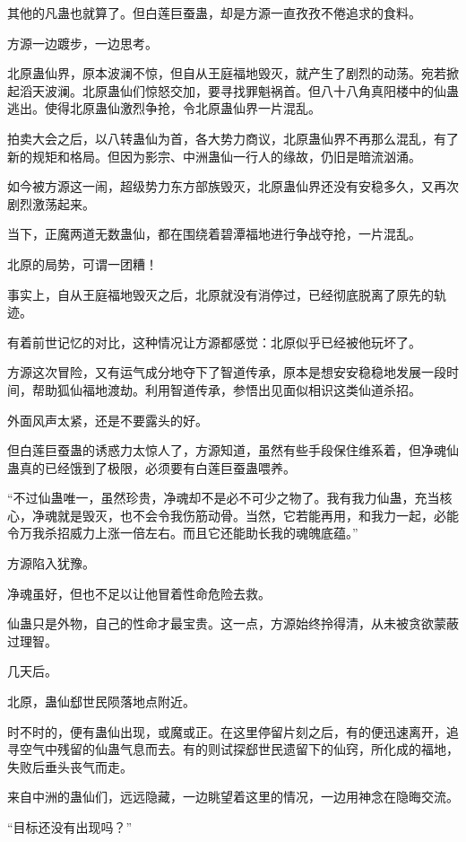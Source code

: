 \begin{this_body}
其他的凡蛊也就算了。但白莲巨蚕蛊，却是方源一直孜孜不倦追求的食料。

方源一边踱步，一边思考。

北原蛊仙界，原本波澜不惊，但自从王庭福地毁灭，就产生了剧烈的动荡。宛若掀起滔天波澜。北原蛊仙们惊怒交加，要寻找罪魁祸首。但八十八角真阳楼中的仙蛊逃出。使得北原蛊仙激烈争抢，令北原蛊仙界一片混乱。

拍卖大会之后，以八转蛊仙为首，各大势力商议，北原蛊仙界不再那么混乱，有了新的规矩和格局。但因为影宗、中洲蛊仙一行人的缘故，仍旧是暗流汹涌。

如今被方源这一闹，超级势力东方部族毁灭，北原蛊仙界还没有安稳多久，又再次剧烈激荡起来。

当下，正魔两道无数蛊仙，都在围绕着碧潭福地进行争战夺抢，一片混乱。

北原的局势，可谓一团糟！

事实上，自从王庭福地毁灭之后，北原就没有消停过，已经彻底脱离了原先的轨迹。

有着前世记忆的对比，这种情况让方源都感觉：北原似乎已经被他玩坏了。

方源这次冒险，又有运气成分地夺下了智道传承，原本是想安安稳稳地发展一段时间，帮助狐仙福地渡劫。利用智道传承，参悟出见面似相识这类仙道杀招。

外面风声太紧，还是不要露头的好。

但白莲巨蚕蛊的诱惑力太惊人了，方源知道，虽然有些手段保住维系着，但净魂仙蛊真的已经饿到了极限，必须要有白莲巨蚕蛊喂养。

“不过仙蛊唯一，虽然珍贵，净魂却不是必不可少之物了。我有我力仙蛊，充当核心，净魂就是毁灭，也不会令我伤筋动骨。当然，它若能再用，和我力一起，必能令万我杀招威力上涨一倍左右。而且它还能助长我的魂魄底蕴。”

方源陷入犹豫。

净魂虽好，但也不足以让他冒着性命危险去救。

仙蛊只是外物，自己的性命才最宝贵。这一点，方源始终拎得清，从未被贪欲蒙蔽过理智。

几天后。

北原，蛊仙郄世民陨落地点附近。

时不时的，便有蛊仙出现，或魔或正。在这里停留片刻之后，有的便迅速离开，追寻空气中残留的仙蛊气息而去。有的则试探郄世民遗留下的仙窍，所化成的福地，失败后垂头丧气而走。

来自中洲的蛊仙们，远远隐藏，一边眺望着这里的情况，一边用神念在隐晦交流。

“目标还没有出现吗？”


\end{this_body}
